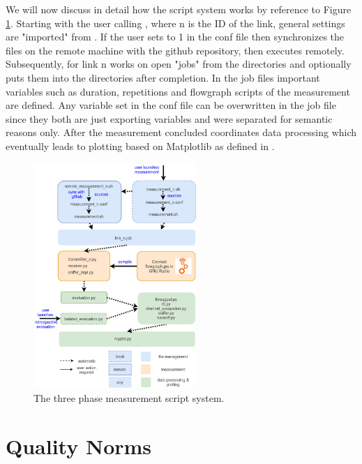 We will now discuss in detail how the script system works by reference to Figure \ref{fig:script-system}.
Starting with the user calling , where n is the ID of the link, general settings are "imported" from . If the user sets  to 1 in the conf file then  synchronizes the files on the remote machine with the github repository, then executes  remotely. Subsequently,  for link n works on open "jobs" from the  directories and optionally puts them into the  directories after completion. In the job files important variables such as duration, repetitions and flowgraph scripts of the measurement are defined. Any variable set in the conf file can be overwritten in the job file since they both are just exporting variables and were separated for semantic reasons only. After the measurement concluded  coordinates data processing which eventually leads to plotting based on Matplotlib as defined in .

\begin{figure}[bt]
	\label{fig:script-system}
	\begin{center}
		\includegraphics[width=0.55\textwidth]{pictures/script_system}
	\end{center}
	\caption{The three phase measurement script system.}
\end{figure}

\section{Quality Norms}
\label{sec:quality-standards}

